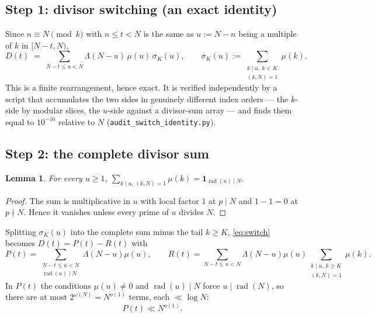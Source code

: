\documentclass[11pt,a4paper]{article}
\theoremstyle{plain}
\newtheorem{lemma}[theorem]{Lemma}
\theoremstyle{definition}
\theoremstyle{remark}
\DeclareMathOperator{\rad}{rad}
\begin{document}
\subsection{Step 1: divisor switching (an exact identity)}

Since $n\equiv N\pmod k$ with $n\le t<N$ is the same as $u:=N-n$ being
a multiple of $k$ in $[N-t,N)$,
\begin{equation}\label{eq:switch}
  D(t)\;=\;\sum_{N-t\le u<N}\Lambda(N-u)\,\mu(u)\,\sigma_K(u),
  \qquad
  \sigma_K(u):=\sum_{\substack{k\mid u,\ k<K\\ (k,N)=1}}\mu(k).
\end{equation}
This is a finite rearrangement, hence exact. It is verified
independently by a script that accumulates the two sides in genuinely
different index orders --- the $k$-side by modular slices, the
$u$-side against a divisor-sum array --- and finds them equal to
$10^{-16}$ relative to $N$
(\texttt{audit\_switch\_identity.py}).

\subsection{Step 2: the complete divisor sum}

\begin{lemma}\label{lem:complete}
For every $u\ge1$,
$\displaystyle\sum_{k\mid u,\ (k,N)=1}\mu(k)=\mathbf 1_{\rad(u)\mid N}$.
\end{lemma}

\begin{proof}
The sum is multiplicative in $u$ with local factor $1$ at $p\mid N$
and $1-1=0$ at $p\nmid N$. Hence it vanishes unless every prime of $u$
divides $N$.
\end{proof}

Splitting $\sigma_K(u)$ into the complete sum minus the tail $k\ge K$,
\eqref{eq:switch} becomes $D(t)=P(t)-R(t)$ with
\begin{equation}\label{eq:PR}
  P(t)=\!\!\sum_{\substack{N-t\le u<N\\ \rad(u)\mid N}}\!\!\Lambda(N-u)\mu(u),
  \qquad
  R(t)=\!\!\sum_{N-t\le u<N}\!\!\Lambda(N-u)\mu(u)
       \sum_{\substack{k\mid u,\ k\ge K\\ (k,N)=1}}\mu(k).
\end{equation}
In $P(t)$ the conditions $\mu(u)\ne0$ and $\rad(u)\mid N$ force
$u\mid\rad(N)$, so there are at most $2^{\omega(N)}=N^{o(1)}$ terms,
each $\ll\log N$:
\begin{equation}\label{eq:P}
  P(t)\ll N^{o(1)}.
\end{equation}
\end{document}
